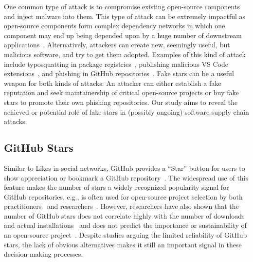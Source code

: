 One common type of attack is to compromise existing open-source components and inject malware into them.
This type of attack can be extremely impactful as open-source components form complex dependency networks in which one component may end up being depended upon by a huge number of downstream applications~\cite{DBLP:conf/uss/ZimmermannSTP19, DBLP:journals/ese/DecanMG19}.
Alternatively, attackers can create new, seemingly useful, but malicious software, and try to get them adopted.
Examples of this kind of attack include typosquatting in package registries~\cite{DBLP:conf/eurosp/VuPMPS20}, publishing malicious VS Code extensions~\cite{vs-code}, and phishing in GitHub repositories~\cite{cao2022fork, stargazer-goblin}.
Fake stars can be a useful weapon for both kinds of attacks: 
An attacker can either establish a fake reputation and seek maintainership of critical open-source projects or buy fake stars to promote their own phishing repositories.
Our study aims to reveal the achieved or potential role of fake stars in (possibly ongoing) software supply chain attacks.

\subsection{GitHub Stars}
\label{sec:github-stars}

Similar to Likes in social networks, GitHub provides a ``Star'' button for users to show appreciation or bookmark a GitHub repository~\cite{DBLP:journals/software/BegelBS13a, DBLP:journals/jss/BorgesV18}.
The widespread use of this feature makes the number of stars a widely recognized popularity signal for GitHub repositories,
e.g., is often used for open-source project selection by both practitioners~\cite{DBLP:journals/pacmhci/QiuLPSV19, DBLP:conf/sigsoft/VargasATBG20, DBLP:conf/sp/WermkeWKFAF22}
and researchers~\cite{DBLP:journals/ese/MunaiahKCN17, koch2024fault}.
However, researchers have also shown that the number of GitHub stars does not correlate highly with the number of downloads and actual installations~\cite{koch2024fault} and does not predict the importance or sustainability of an open-source project~\cite{schueller2024modeling, DBLP:journals/corr/abs-2405-07508}.
Despite studies arguing the limited reliability of GitHub stars, the lack of obvious alternatives makes it still an important signal in these decision-making processes.

